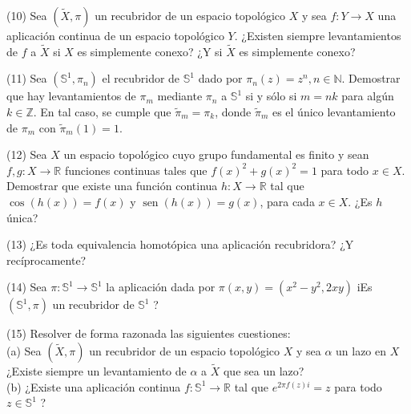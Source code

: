 \documentclass[
  a4paper,
  spanish,
  12pt,
]{scrartcl}
\begin{document}
\begin{ejer}
(10) Sea $(\widetilde{X}, \pi)$ un recubridor de un espacio topológico $X$ y sea $f: Y \rightarrow X$ una aplicación continua de un espacio topológico $Y$. ¿Existen siempre levantamientos de $f$ a $\widetilde{X}$ si $X$ es simplemente conexo? ¿Y si $\widetilde{X}$ es simplemente conexo?\\
\end{ejer}

\begin{ejer}
(11) Sea $\left(\mathbb{S}^{1}, \pi_{n}\right)$ el recubridor de $\mathbb{S}^{1}$ dado por $\pi_{n}(z)=z^{n}, n \in \mathbb{N}$. Demostrar que hay levantamientos de $\pi_{m}$ mediante $\pi_{n}$ a $\mathbb{S}^{1}$ si y sólo si $m=n k$ para algún $k \in \mathbb{Z}$. En tal caso, se cumple que $\widetilde{\pi}_{m}=\pi_{k}$, donde $\widetilde{\pi}_{m}$ es el único levantamiento de $\pi_{m}$ con $\widetilde{\pi}_{m}(1)=1$.\\
\end{ejer}

\begin{ejer}
(12) Sea $X$ un espacio topológico cuyo grupo fundamental es finito y sean $f, g: X \rightarrow \mathbb{R}$ funciones continuas tales que $f(x)^{2}+g(x)^{2}=1$ para todo $x \in X$. Demostrar que existe una función continua $h: X \rightarrow \mathbb{R}$ tal que $\cos (h(x))=f(x)$ y $\operatorname{sen}(h(x))=g(x)$, para cada $x \in X$. ¿Es $h$ única?\\
\end{ejer}

\begin{ejer}
(13) ¿Es toda equivalencia homotópica una aplicación recubridora? ¿Y recíprocamente?\\
\end{ejer}

\begin{ejer}
(14) Sea $\pi: \mathbb{S}^{1} \rightarrow \mathbb{S}^{1}$ la aplicación dada por $\pi(x, y)=\left(x^{2}-y^{2}, 2 x y\right)$ iEs $\left(\mathbb{S}^{1}, \pi\right)$ un recubridor de $\mathbb{S}^{1}$ ?\\
\end{ejer}

\begin{ejer}
(15) Resolver de forma razonada las siguientes cuestiones:\\
(a) Sea $(\widetilde{X}, \pi)$ un recubridor de un espacio topológico $X$ y sea $\alpha$ un lazo en $X$ ¿Existe siempre un levantamiento de $\alpha$ a $\widetilde{X}$ que sea un lazo?\\
(b) ¿Existe una aplicación continua $f: \mathbb{S}^{1} \rightarrow \mathbb{R}$ tal que $e^{2 \pi f(z) i}=z$ para todo $z \in \mathbb{S}^{1}$ ?\\
\end{ejer}
\end{document}
